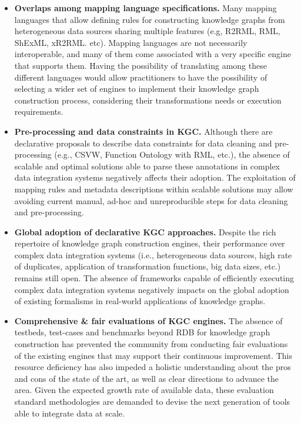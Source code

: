 \begin{itemize}
    \item \textbf{Overlaps among mapping language specifications.} Many mapping languages that allow defining rules for constructing knowledge graphs from heterogeneous data sources sharing multiple features (e.g, R2RML, RML, ShExML, xR2RML. etc). Mapping languages are not necessarily interoperable, and many of them come associated with a very specific engine that supports them. Having the possibility of translating among these different languages would allow practitioners to have the possibility of selecting a wider set of engines to implement their knowledge graph construction process, considering their transformations needs or execution requirements.
    \item \textbf{Pre-processing and data constraints in KGC.} Although there are declarative proposals to describe data constraints for data cleaning and pre-processing (e.g., CSVW, Function Ontology with RML, etc.), the absence of scalable and optimal solutions able to parse these annotations in complex data integration systems negatively affects their adoption. The exploitation of mapping rules and metadata descriptions within scalable solutions may allow avoiding current manual, ad-hoc and unreproducible steps for data cleaning and pre-processing.  
 
    \item \textbf{Global adoption of declarative KGC approaches.} Despite the rich repertoire of knowledge graph construction engines, their performance over complex data integration systems (i.e., heterogeneous data sources, high rate of duplicates, application of transformation functions, big data sizes, etc.) remains still open. The absence of frameworks capable of efficiently executing complex data integration systems negatively impacts on the global adoption of existing formalisms in real-world applications of knowledge graphs.
    \item \textbf{Comprehensive \& fair evaluations of KGC engines.} The absence of testbeds, test-cases and benchmarks beyond RDB for knowledge graph construction has prevented the community from conducting fair evaluations of the existing engines that may support their continuous improvement. This resource deficiency has also impeded a holistic understanding about the pros and cons of the state of the art, as well as clear directions to advance the area. Given the expected growth rate of available data, these evaluation standard methodologies are demanded to devise the next generation of tools able to integrate data at scale.
\end{itemize}